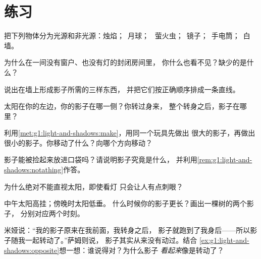 \section{练习}

\begin{exercise}[$\star$]\label{exo:g1:light-and-shadows:1}
把下列物体分为光源和非光源：烛焰；\ 月球；
\ 萤火虫；\ 镜子；\ 手电筒；\ 白墙。
\end{exercise}

\begin{exercise}[$\star$]\label{exo:g1:light-and-shadows:2}
为什么在一间没有窗户、也没有灯的封闭房间里，
你什么也看不见？缺少的是什么？
\end{exercise}

\begin{exercise}[$\star$]\label{exo:g1:light-and-shadows:3}
说出在墙上形成影子所需的三样东西，
并把它们按正确顺序排成一条直线。
\end{exercise}

\begin{exercise}[$\star$]\label{exo:g1:light-and-shadows:4}
太阳在你的左边，你的影子在哪一侧？你转过身来，
整个转身之后，影子在哪里？
\end{exercise}

\begin{exercise}[$\star$]\label{exo:g1:light-and-shadows:5}
利用\cref{met:g1:light-and-shadows:make}，用同一个玩具先做出
很大的影子，再做出很小的影子。你移动了什么？向哪个方向移动？
\end{exercise}

\begin{exercise}[$\star$]\label{exo:g1:light-and-shadows:6}
影子能被捡起来放进口袋吗？请说明影子究竟是什么，
并利用\cref{rem:g1:light-and-shadows:notathing}作答。
\end{exercise}

\begin{exercise}[$\star$]\label{exo:g1:light-and-shadows:7}
为什么绝对不能直视太阳，即使看灯
只会让人有点刺眼？
\end{exercise}

\begin{exercise}[$\star$]\label{exo:g1:light-and-shadows:8}
中午太阳高挂；傍晚时太阳低垂。
什么时候你的影子更长？画出一棵树的两个影子，
分别对应两个时刻。
\end{exercise}

\begin{exercise}[$\star\star$]\label{exo:g1:light-and-shadows:9}
米娅说：“我的影子原来在我前面，我转身之后，
影子就跑到了我身后——所以影子随我一起转动了。”萨姆则说，
影子其实从来没有动过。结合
\cref{ex:g1:light-and-shadows:opposite}想一想：谁说得对？为什么影子
\emph{看起来}像是转动了？
\end{exercise}
